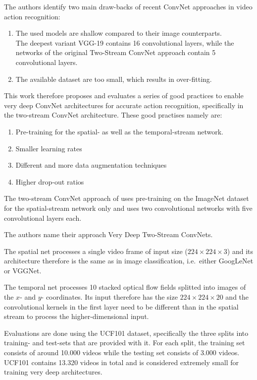The authors identify two main draw-backs of recent ConvNet approaches in video action recognition:
\begin{enumerate}
    \item The used models are shallow compared to their image counterparts. \\
        The deepest variant VGG-19 contains 16 convolutional layers, while the networks of the original Two-Stream ConvNet approach contain 5 convolutional layers.
    \item The available dataset are too small, which results in over-fitting.
\end{enumerate}

This work therefore proposes and evaluates a series of good practices to enable very deep ConvNet architectures for accurate action recognition, specifically in the two-stream ConvNet architecture.
These good practises namely are:
\begin{enumerate}
    \item Pre-training for the spatial- as well as the temporal-stream network.
    \item Smaller learning rates
    \item Different and more data augmentation techniques
    \item Higher drop-out ratios
\end{enumerate}

The two-stream ConvNet approach of \textcite{simonyan_two-stream_2014} uses pre-training on the ImageNet dataset for the spatial-stream network only and uses two convolutional networks with five convolutional layers each.

The authors name their approach Very Deep Two-Stream ConvNets.

The spatial net processes a single video frame of input size ($224 \times 224 \times 3$) and its architecture therefore is the same as in image classification, i.e.\ either GoogLeNet or VGGNet.

The temporal net processes 10 stacked optical flow fields splitted into images of the $x$- and $y$- coordinates.
Its input therefore has the size $224 \times 224 \times 20$ and the convolutional kernels in the first layer need to be different than in the spatial stream to process the higher-dimensional input.

Evaluations are done using the UCF101 dataset, specifically the three splits into training- and test-sets that are provided with it.
For each split, the training set consists of around 10.000 videos while the testing set consists of 3.000 videos.
UCF101 contains 13.320 videos in total and is considered extremely small for training very deep architectures.

